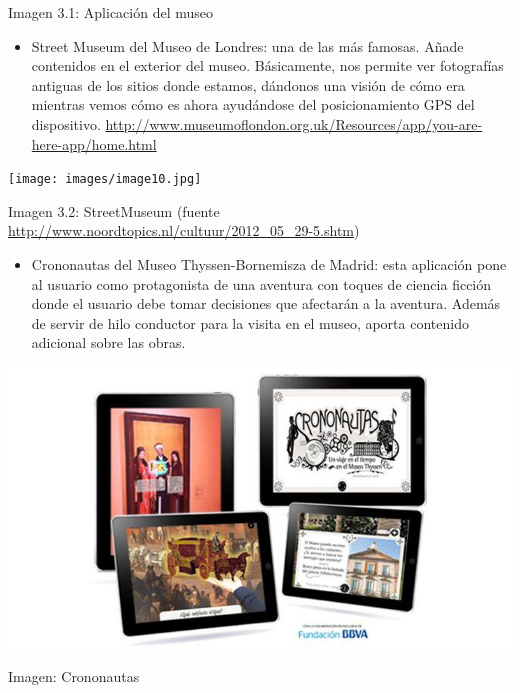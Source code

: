 \documentclass[]{article}
\begin{document}
Imagen 3.1: Aplicación del museo

\begin{itemize}
\itemsep1pt\parskip0pt
\item
  Street Museum del Museo de Londres: una de las más famosas. Añade
  contenidos en el exterior del museo. Básicamente, nos permite ver
  fotografías antiguas de los sitios donde estamos, dándonos una visión
  de cómo era mientras vemos cómo es ahora ayudándose del
  posicionamiento GPS del dispositivo.
  \href{https://www.google.com/url?q=http://www.museumoflondon.org.uk/Resources/app/you-are-here-app/home.html\&sa=D\&ust=1464799690061000\&usg=AFQjCNHSmkQacw30ljnyv7J_7XluPlwZiw}{http://www.museumoflondon.org.uk/Resources/app/you-are-here-app/home.html}
\end{itemize}

\texttt{[image: images/image10.jpg]}

Imagen 3.2: StreetMuseum (fuente
\href{https://www.google.com/url?q=http://www.noordtopics.nl/cultuur/2012_05_29-5.shtm\&sa=D\&ust=1464799690063000\&usg=AFQjCNE08rMhih_IPupKwcOaYUXUsWQkHw}{http://www.noordtopics.nl/cultuur/2012\_05\_29-5.shtm})

\begin{itemize}
\itemsep1pt\parskip0pt
\item
  Crononautas del Museo Thyssen-Bornemisza de Madrid: esta aplicación
  pone al usuario como protagonista de una aventura con toques de
  ciencia ficción donde el usuario debe tomar decisiones que afectarán a
  la aventura. Además de servir de hilo conductor para la visita en el
  museo, aporta contenido adicional sobre las obras.
\end{itemize}

\includegraphics{images/image07.jpg}

Imagen: Crononautas
\end{document}
